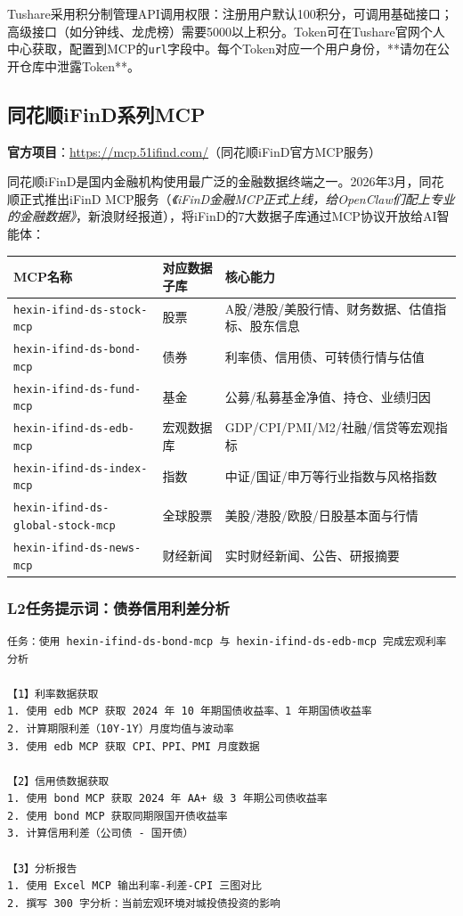 \begin{theorybox}[Tushare积分制与Token管理]
Tushare采用积分制管理API调用权限：注册用户默认100积分，可调用基础接口；高级接口（如分钟线、龙虎榜）需要5000以上积分。Token可在Tushare官网个人中心获取，配置到MCP的\texttt{url}字段中。每个Token对应一个用户身份，**请勿在公开仓库中泄露Token**。
\end{theorybox}

\subsection{同花顺iFinD系列MCP}

\textbf{官方项目}：\url{https://mcp.51ifind.com/}（同花顺iFinD官方MCP服务）

同花顺iFinD是国内金融机构使用最广泛的金融数据终端之一。2026年3月，同花顺正式推出iFinD MCP服务（\textit{《iFinD金融MCP正式上线，给OpenClaw们配上专业的金融数据》}，新浪财经报道），将iFinD的7大数据子库通过MCP协议开放给AI智能体：

\begin{table}[H]
\centering
\small
\begin{tabular}{llp{8cm}}
\toprule
\textbf{MCP名称} & \textbf{对应数据子库} & \textbf{核心能力} \\
\midrule
\texttt{hexin-ifind-ds-stock-mcp} & 股票 & A股/港股/美股行情、财务数据、估值指标、股东信息 \\
\texttt{hexin-ifind-ds-bond-mcp} & 债券 & 利率债、信用债、可转债行情与估值 \\
\texttt{hexin-ifind-ds-fund-mcp} & 基金 & 公募/私募基金净值、持仓、业绩归因 \\
\texttt{hexin-ifind-ds-edb-mcp} & 宏观数据库 & GDP/CPI/PMI/M2/社融/信贷等宏观指标 \\
\texttt{hexin-ifind-ds-index-mcp} & 指数 & 中证/国证/申万等行业指数与风格指数 \\
\texttt{hexin-ifind-ds-global-stock-mcp} & 全球股票 & 美股/港股/欧股/日股基本面与行情 \\
\texttt{hexin-ifind-ds-news-mcp} & 财经新闻 & 实时财经新闻、公告、研报摘要 \\
\bottomrule
\end{tabular}
\end{table}

\subsubsection{L2任务提示词：债券信用利差分析}

\begin{lstlisting}
任务：使用 hexin-ifind-ds-bond-mcp 与 hexin-ifind-ds-edb-mcp 完成宏观利率分析

【1】利率数据获取
1. 使用 edb MCP 获取 2024 年 10 年期国债收益率、1 年期国债收益率
2. 计算期限利差（10Y-1Y）月度均值与波动率
3. 使用 edb MCP 获取 CPI、PPI、PMI 月度数据

【2】信用债数据获取
1. 使用 bond MCP 获取 2024 年 AA+ 级 3 年期公司债收益率
2. 使用 bond MCP 获取同期限国开债收益率
3. 计算信用利差（公司债 - 国开债）

【3】分析报告
1. 使用 Excel MCP 输出利率-利差-CPI 三图对比
2. 撰写 300 字分析：当前宏观环境对城投债投资的影响
\end{lstlisting}

